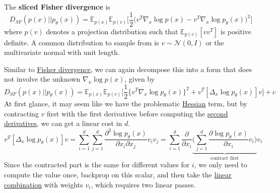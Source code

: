 \documentclass{article}
\begin{document}
    \begin{definition}
      \label{def:sliced-fisher-divergence}
      The \textbf{sliced Fisher divergence} is 
      \begin{equation}
        D_{SF} (p(x) || p_\theta (x)) = \mathbb{E}_{p(x)} \mathbb{E}_{p(v)} \bigg[ \frac{1}{2} \big( v^T \nabla_x \log p (x) - v^T \nabla_x \log p_\theta (x) \big)^2 \bigg]
      \end{equation}
      where $p(v)$ denotes a projection distribution such that $\mathbb{E}_{p(v)} [v v^T]$ is positive definite. A common distribution to sample from is $v \sim \mathcal{N}(0, I)$ or the multivariate normal with unit length. 
    \end{definition} 

    Similar to \hyperref[def:fisher-divergence]{Fisher divergence}, we can again decompose this into a form that does not involve the unknown $\nabla_x \log p(x)$, given by 
    \begin{equation}
      D_{SF} (p(x) || p_\theta(x)) = \mathbb{E}_{p(x)} \mathbb{E}_{p(v)} \bigg[ \frac{1}{2} \{ v^T \nabla_x \log p_\theta (x) \}^2 + v^T [\Delta_x \log p_\theta (x)]v \bigg] + c
    \end{equation}
    At first glance, it may seem like we have the problematic \hyperref[mv-def:hessian]{Hessian} term, but by contracting $v$ first with the first derivatives before computing the \hyperref[mv-def:second-derivative]{second derivatives}, we can get a linear cost in $d$. 
    \begin{equation}
      v^T [\Delta_x \log p_\theta (x)]v = \sum_{i=1}^d \sum_{j=1}^d \frac{\partial^2 \log p_\theta (x)}{\partial x_i \partial x_j} v_i v_j = \sum_{i=1}^d \frac{\partial}{\partial x_i} \underbrace{\bigg( \sum_{j=1}^d \frac{\partial \log p_\theta (x)}{\partial x_i} v_i \bigg)}_{\text{contract first}} v_i
    \end{equation}
    Since the contracted part is the same for different values for $i$, we only need to compute the value once, backprop on this scalar, and then take the \hyperref[lin-def:linear-combination]{linear combination} with weights $v_i$, which requires two linear passes. 
\end{document}
